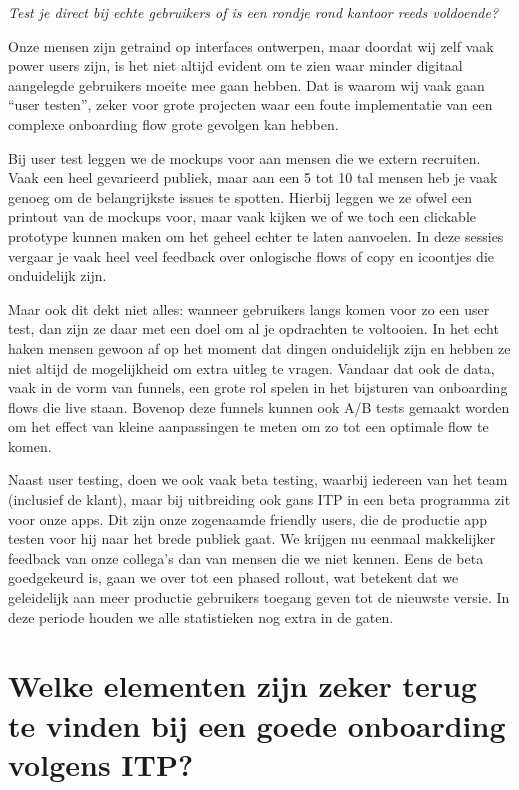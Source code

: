 \textit{Test je direct bij echte gebruikers of is een rondje rond kantoor reeds voldoende?}

Onze mensen zijn getraind op interfaces ontwerpen, maar doordat wij zelf vaak power users zijn, is het niet altijd evident om te zien waar minder digitaal aangelegde gebruikers moeite mee gaan hebben. Dat is waarom wij vaak gaan ``user testen'', zeker voor grote projecten waar een foute implementatie van een complexe onboarding flow grote gevolgen kan hebben.

Bij user test leggen we de mockups voor aan mensen die we extern recruiten. Vaak een heel gevarieerd publiek, maar aan een 5 tot 10 tal mensen heb je vaak genoeg om de belangrijkste issues te spotten. Hierbij leggen we ze ofwel een printout van de mockups voor, maar vaak kijken we of we toch een clickable prototype kunnen maken om het geheel echter te laten aanvoelen. In deze sessies vergaar je vaak heel veel feedback over onlogische flows of copy en icoontjes die onduidelijk zijn.

Maar ook dit dekt niet alles: wanneer gebruikers langs komen voor zo een user test, dan zijn ze daar met een doel om al je opdrachten te voltooien. In het echt haken mensen gewoon af op het moment dat dingen onduidelijk zijn en hebben ze niet altijd de mogelijkheid om extra uitleg te vragen. Vandaar dat ook de data, vaak in de vorm van funnels, een grote rol spelen in het bijsturen van onboarding flows die live staan. Bovenop deze funnels kunnen ook A/B tests gemaakt worden om het effect van kleine aanpassingen te meten om zo tot een optimale flow te komen.

Naast user testing, doen we ook vaak beta testing, waarbij iedereen van het team (inclusief de klant), maar bij uitbreiding ook gans ITP in een beta programma zit voor onze apps. Dit zijn onze zogenaamde friendly users, die de productie app testen voor hij naar het brede publiek gaat. We krijgen nu eenmaal makkelijker feedback van onze collega's dan van mensen die we niet kennen. Eens de beta goedgekeurd is, gaan we over tot een phased rollout, wat betekent dat we geleidelijk aan meer productie gebruikers toegang geven tot de nieuwste versie. In deze periode houden we alle statistieken nog extra in de gaten.

\section[Vraag 3]{Welke elementen zijn zeker terug te vinden bij een goede onboarding volgens ITP?}


